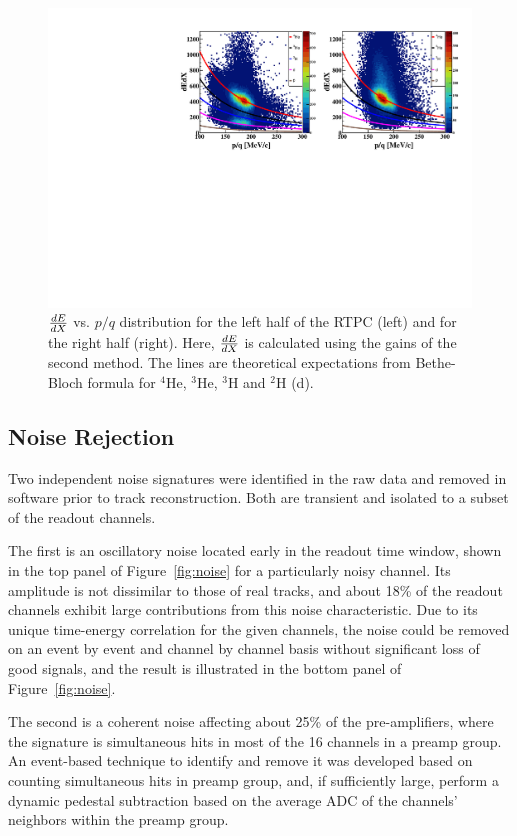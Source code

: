\documentclass[twocolumn,showpacs,superscriptaddress,groupedaddress]{revtex4}
\begin{document}
\begin{figure}[tb]
\centering
\includegraphics[scale=0.45]{fig_2017/f_dedx_p_exp_2nd.pdf}
\caption{$\small{\frac{dE}{dX}}$ vs. $p/q$ distribution for the left half of 
   the RTPC (left) and for the right half (right). Here, 
   $\small{\frac{dE}{dX}}$ is calculated using the gains of the second method.  
   The lines are theoretical expectations from Bethe-Bloch formula for $^4$He, 
$^3$He, $^3$H and $^2$H (d).}
\label{fig:dedx_p_exp_2nd}
\end{figure}

\subsection{Noise Rejection}
Two independent noise signatures were identified in the raw data and removed in software prior to track reconstruction.  Both are transient and isolated to a subset of the readout channels. 

The first is an oscillatory noise located early in the readout time window, shown in the top panel of Figure~\ref{fig:noise} for a particularly noisy channel.  Its amplitude is not dissimilar to those of real tracks, and about 18\% of the readout channels exhibit large contributions from this noise characteristic.  Due to its unique time-energy correlation for the given channels, the noise could be removed on an event by event and channel by channel basis without significant loss of good signals, and the result is illustrated in the bottom panel of Figure~\ref{fig:noise}.

The second is a coherent noise affecting about 25\% of the pre-amplifiers, where the signature is simultaneous hits in most of the 16 channels in a preamp group.   An event-based technique to identify and remove it was developed based on counting simultaneous hits in preamp group, and, if sufficiently large, perform a dynamic pedestal subtraction based on the average ADC of the channels' neighbors within the preamp group.
\end{document}
